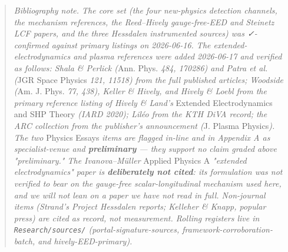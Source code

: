 \documentclass[11pt]{article}
\begin{document}
\begin{quote}\emph{Bibliography note. The core set (the four new-physics detection channels, the mechanism references, the Reed--Hively gauge-free-EED and Steinetz LCF papers, and the three Hessdalen instrumented sources) was ✓-confirmed against primary listings on 2026-06-16. The extended-electrodynamics and plasma references were added 2026-06-17 and verified as follows: Shala \& Perlick (}Ann. Phys.\emph{ 484, 170286) and Patra et al. (}JGR Space Physics\emph{ 121, 11518) from the full published articles; Woodside (}Am. J. Phys.\emph{ 77, 438), Keller \& Hively, and Hively \& Loebl from the primary reference listing of Hively \& Land's }Extended Electrodynamics and SHP Theory\emph{ (IARD 2020); Liléo from the KTH DiVA record; the ARC collection from the publisher's announcement (}J. Plasma Physics\emph{). The two }Physics Essays\emph{ items are flagged in-line and in Appendix A as specialist-venue and \textbf{preliminary} --- they support no claim graded above "preliminary." The Ivanova--Müller }Applied Physics A\emph{ "extended electrodynamics" paper is \textbf{deliberately not cited}: its formulation was not verified to bear on the gauge-free scalar-longitudinal mechanism used here, and we will not lean on a paper we have not read in full. Non-journal items (Strand's Project Hessdalen reports; Kelleher \& Knapp, popular press) are cited as record, not measurement. Rolling registers live in \texttt{Research/sources/} (portal-signature-sources, framework-corroboration-batch, and hively-EED-primary).}\end{quote}
\end{document}
